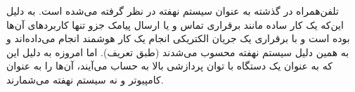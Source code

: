 
تلفن‌همراه در گذشته به عنوان سیستم نهفته در نظر گرفته می‌شده است. به دلیل این‌که یک کار ساده مانند برقراری تماس و یا ارسال پیامک جزو تنها کاربردهای آن‌ها بوده است و با برقراری یک جریان الکتریکی انجام یک کار هوشمند انجام می‌داده‌اند و به همین دلیل سیستم نهفته محسوب می‌شدند (طبق تعریف). اما امروزه به دلیل این که به عنوان یک دستگاه با توان پردازشی بالا به حساب می‌آیند، آن‌ها را به عنوان کامپیوتر و نه سیستم نهفته می‌شمارند.